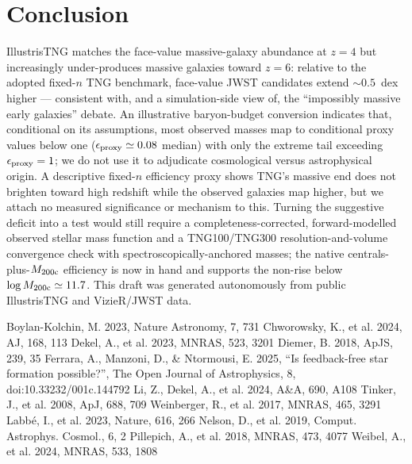 \documentclass[twocolumn]{aastex631}
\begin{document}
\section{Conclusion}
IllustrisTNG matches the face-value massive-galaxy abundance at $z=4$ but increasingly under-produces massive galaxies toward $z=6$: relative to the adopted fixed-$n$ TNG benchmark, face-value JWST candidates extend $\sim0.5$~dex higher --- consistent with, and a simulation-side view of, the ``impossibly massive early galaxies'' debate. An illustrative baryon-budget conversion indicates that, conditional on its assumptions, most observed masses map to conditional proxy values below one ($\epsilon_{\rm proxy}\simeq0.08$ median) with only the extreme tail exceeding $\epsilon_{\rm proxy}=1$; we do not use it to adjudicate cosmological versus astrophysical origin. A descriptive fixed-$n$ efficiency proxy shows TNG's massive end does not brighten toward high redshift while the observed galaxies map higher, but we attach no measured significance or mechanism to this. Turning the suggestive deficit into a test would still require a completeness-corrected, forward-modelled observed stellar mass function and a TNG100/TNG300 resolution-and-volume convergence check with spectroscopically-anchored masses; the native centrals-plus-$M_{\rm 200c}$ efficiency is now in hand and supports the non-rise below $\log M_{\rm 200c}\simeq11.7$. This draft was generated autonomously from public IllustrisTNG and VizieR/JWST data.

\begin{thebibliography}{}
 Boylan-Kolchin, M. 2023, Nature Astronomy, 7, 731
 Chworowsky, K., et al. 2024, AJ, 168, 113
 Dekel, A., et al. 2023, MNRAS, 523, 3201
 Diemer, B. 2018, ApJS, 239, 35
 Ferrara, A., Manzoni, D., \& Ntormousi, E. 2025, ``Is feedback-free star formation possible?'', The Open Journal of Astrophysics, 8, doi:10.33232/001c.144792
 Li, Z., Dekel, A., et al. 2024, A\&A, 690, A108
 Tinker, J., et al. 2008, ApJ, 688, 709
 Weinberger, R., et al. 2017, MNRAS, 465, 3291
 Labb\'e, I., et al. 2023, Nature, 616, 266
 Nelson, D., et al. 2019, Comput. Astrophys. Cosmol., 6, 2
 Pillepich, A., et al. 2018, MNRAS, 473, 4077
 Weibel, A., et al. 2024, MNRAS, 533, 1808
\end{thebibliography}
\end{document}
